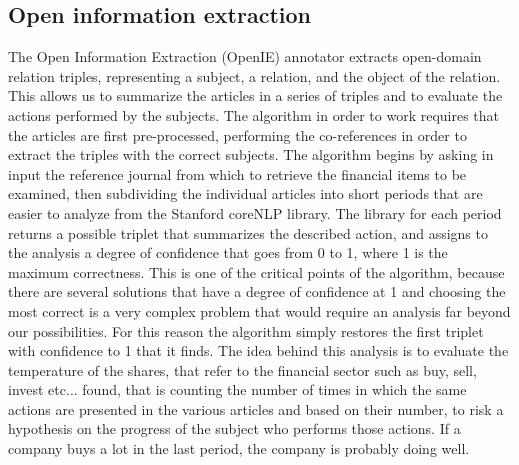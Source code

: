 \subsection{Open information extraction}
The Open Information Extraction (OpenIE) annotator extracts open-domain relation triples, representing a subject, a relation, and the object of the relation. This allows us to summarize the articles in a series of triples and to evaluate the actions performed by the subjects. 
The algorithm in order to work requires that the articles are first pre-processed, performing the co-references in order to extract the triples with the correct subjects. 
The algorithm begins by asking in input the reference journal from which to retrieve the financial items to be examined, then subdividing the individual articles into short periods that are easier to analyze from the Stanford coreNLP library. The library for each period returns a possible triplet that summarizes the described action, and assigns to the analysis a degree of confidence that goes from 0 to 1, where 1 is the maximum correctness. This is one of the critical points of the algorithm, because there are several solutions that have a degree of confidence at 1 and choosing the most correct is a very complex problem that would require an analysis far beyond our possibilities. For this reason the algorithm simply restores the first triplet with confidence to 1 that it finds.
The idea behind this analysis is to evaluate the temperature of the shares, that refer to the financial sector such as buy, sell, invest etc... found, that is counting the number of times in which the same actions are presented in the various articles and based on their number, to risk a hypothesis on the progress of the subject who performs those actions. If a company buys a lot in the last period, the company is probably doing well.
